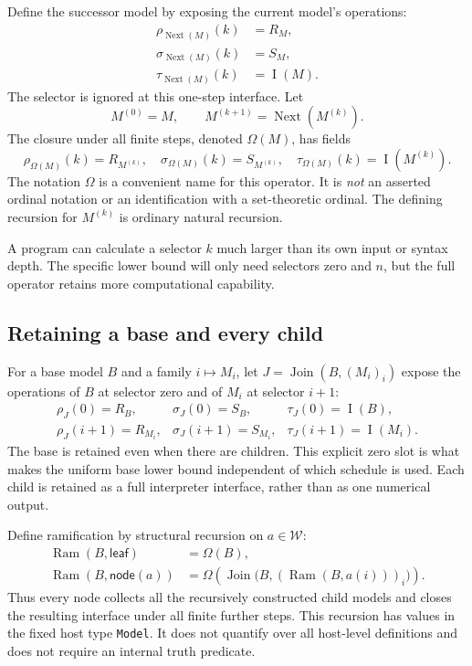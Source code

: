 \documentclass[11pt,letterpaper]{article}
\theoremstyle{definition}
\newcommand{\W}{\mathcal W}
\newcommand{\Next}{\operatorname{Next}}
\newcommand{\MJoin}{\operatorname{Join}}
\newcommand{\Ram}{\operatorname{Ram}}
\newcommand{\idx}{\operatorname{I}}
\newcommand{\code}[1]{\texttt{#1}}
\begin{document}
Define the successor model by exposing the current model's operations:
\begin{equation}\label{eq:next}
 \begin{split}
 \rho_{\Next(M)}(k)&=R_M,\\
 \sigma_{\Next(M)}(k)&=S_M,\\
 \tau_{\Next(M)}(k)&=\idx(M).
 \end{split}
\end{equation}
The selector is ignored at this one-step interface. Let
\[
 M^{(0)}=M,\qquad M^{(k+1)}=\Next(M^{(k)}).
\]
The closure under all finite steps, denoted $\Omega(M)$, has fields
\begin{equation}\label{eq:omega}
 \rho_{\Omega(M)}(k)=R_{M^{(k)}},\quad
 \sigma_{\Omega(M)}(k)=S_{M^{(k)}},\quad
 \tau_{\Omega(M)}(k)=\idx(M^{(k)}).
\end{equation}
The notation $\Omega$ is a convenient name for this operator. It is
\emph{not} an asserted ordinal notation or an identification with a set-theoretic
ordinal. The defining recursion for $M^{(k)}$ is ordinary natural recursion.

A program can calculate a selector $k$ much larger than its own input or
syntax depth. The specific lower bound will only need selectors zero and
$n$, but the full operator retains more computational capability.

\subsection{Retaining a base and every child}

For a base model $B$ and a family $i\mapsto M_i$, let
$J=\MJoin(B,(M_i)_i)$ expose the operations of $B$ at selector zero and of
$M_i$ at selector $i+1$:
\begin{equation}\label{eq:join}
 \begin{array}{lll}
 \rho_J(0)=R_B,&\sigma_J(0)=S_B,&\tau_J(0)=\idx(B),\\
 \rho_J(i+1)=R_{M_i},&\sigma_J(i+1)=S_{M_i},&
                         \tau_J(i+1)=\idx(M_i).
 \end{array}
\end{equation}
The base is retained even when there are children. This explicit zero slot is
what makes the uniform base lower bound independent of which schedule is
used. Each child is retained as a full interpreter interface, rather than as
one numerical output.

Define ramification by structural recursion on $a\in\W$:
\begin{equation}\label{eq:ramify}
 \begin{split}
 \Ram(B,\mathsf{leaf})&=\Omega(B),\\
 \Ram(B,\mathsf{node}(a))&=
    \Omega\!\left(\MJoin\bigl(B,(\Ram(B,a(i)))_i\bigr)\right).
 \end{split}
\end{equation}
Thus every node collects all the recursively constructed child models and
closes the resulting interface under all finite further steps. This recursion
has values in the fixed host type \code{Model}. It does not quantify over all
host-level definitions and does not require an internal truth predicate.
\end{document}
